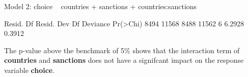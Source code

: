 \documentclass[12pt,letterpaper]{article}
\begin{document}
\begin{enumerate}
\begin{enumerate}
		Model 2: choice ~ countries + sanctions + countries:sanctions
		
		Resid. Df Resid. Dev Df Deviance Pr(>Chi)
		      8494      11568                     
		      8488      11562       6        6.2928          0.3912
		\vspace{.5cm}
		
		The p-value above the benchmark of 5\% shows that the interaction term of \textbf{countries} and \textbf{sanctions} does not have a signifcant impact on the response variable \textbf{choice}.
		
		
	\end{enumerate}
	\end{enumerate}
\end{document}
